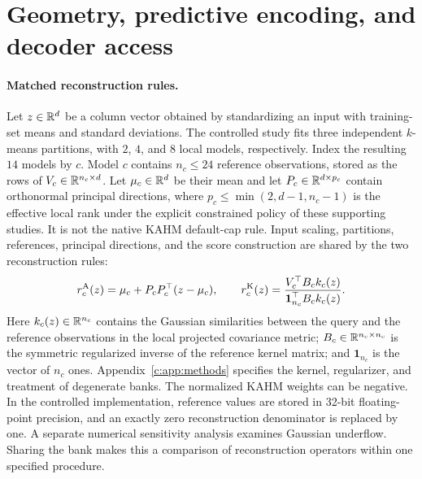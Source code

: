 \section{Geometry, predictive encoding, and decoder access}\label{c:sec:method}

\paragraph{Matched reconstruction rules.}
Let $z\in\mathbb{R}^d$ be a column vector obtained by standardizing an input with
training-set means and standard deviations. The controlled study fits three
independent $k$-means partitions, with $2$, $4$, and $8$ local models,
respectively. Index the resulting $14$ models by $c$. Model $c$ contains
$n_c\leq24$ reference observations, stored as the rows of
$V_c\in\mathbb{R}^{n_c\times d}$. Let $\mu_c\in\mathbb{R}^d$ be their mean and let
$P_c\in\mathbb{R}^{d\times p_c}$ contain orthonormal principal directions, where
$p_c\leq\min(2,d-1,n_c-1)$ is the effective local rank under the
explicit constrained policy of these supporting studies. It is not the
native KAHM default-cap rule. Input scaling,
partitions, references, principal directions, and the score construction
are shared by the two reconstruction rules:
\begin{equation}\label{c:eq:affine}
 r_c^{\mathrm{A}}(z)=\mu_c+P_cP_c^\top(z-\mu_c),\qquad
 r_c^{\mathrm{K}}(z)=
 \frac{V_c^\top B_c k_c(z)}{\boldsymbol 1_{n_c}^\top B_c k_c(z)}.
\end{equation}
Here $k_c(z)\in\mathbb{R}^{n_c}$ contains the Gaussian similarities between the
query and the reference observations in the local projected covariance
metric; $B_c\in\mathbb{R}^{n_c\times n_c}$ is the symmetric regularized inverse of
the reference kernel matrix; and $\boldsymbol 1_{n_c}$ is the vector of
$n_c$ ones. Appendix~\ref{c:app:methods} specifies the kernel, regularizer,
and treatment of degenerate banks. The normalized KAHM weights can be
negative. In the controlled implementation, reference values are stored in
32-bit floating-point precision, and an exactly zero reconstruction
denominator is replaced by one. A separate numerical sensitivity analysis
examines Gaussian underflow. Sharing the bank makes this a comparison of
reconstruction operators within one specified procedure.


